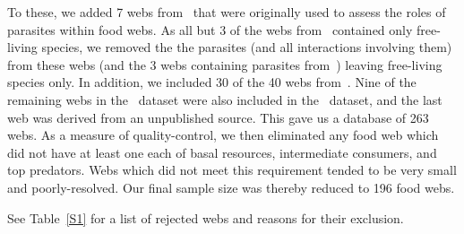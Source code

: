 \documentclass[12pt]{article}
\begin{document}
  To these, we added 7 webs from~\cite{Dunne2013} that were originally used
  to assess the roles of parasites within food webs. As all but 3 of the webs
  from~\cite{GlobalWeb} contained only free-living species, we removed the
  the parasites (and all interactions involving them) from these webs (and the
  3 webs containing parasites from~\cite{GlobalWeb}) leaving free-living
  species only. In addition, we included 30 of the 40 webs
  from~\cite{Riede2011}. Nine of the
  remaining webs in the~\cite{Riede2011} dataset were also included in
  the~\cite{GlobalWeb}  dataset, and the last web was derived from an
  unpublished source. This gave us a database of 263 webs. As a measure of
  quality-control, we then eliminated any food web which did not have at least
  one each of basal resources, intermediate consumers, and top predators. Webs
  which did not meet this requirement tended to be very small and poorly-resolved.
  Our final sample size was thereby reduced to 196 food webs.



 See Table~\ref{S1} for a list of rejected webs and reasons for their
  exclusion. 
\end{document}
